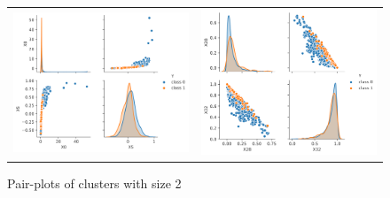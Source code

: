\documentclass[twoside,11pt]{article}
\begin{document}
\begin{figure}[h]
\begin{tabular}{ll}
\includegraphics[scale=0.5]{Figures/Empirical/cluster size1_1.png}
&
\includegraphics[scale=0.5]{Figures/Empirical/cluster size1_2.png}
\end{tabular}
\caption{Pair-plots of clusters with size 2} 
\label{cluster_size2}
\end{figure}
\end{document}
